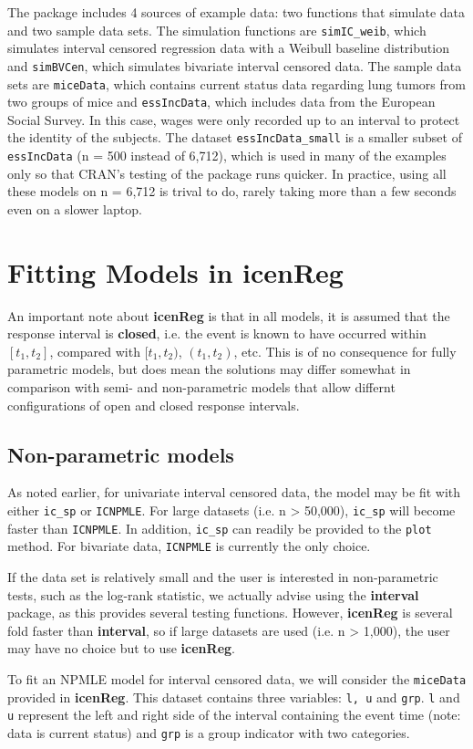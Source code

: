 \documentclass[11pt]{report}
\begin{document}
  The package includes 4 sources of example data: two functions that simulate data and
  two sample data sets. The simulation functions are \texttt{simIC\_weib}, which simulates
  interval censored regression data with a Weibull baseline distribution and 
  \texttt{simBVCen}, which simulates bivariate interval censored data. The sample data sets
  are \texttt{miceData}, which contains current status data regarding lung tumors 
  from two groups of mice and \texttt{essIncData}, which includes data from the European
  Social Survey. In this case, wages were only recorded up to an interval to 
  protect the identity of the subjects. The dataset \texttt{essIncData\_small} is a smaller
  subset of \texttt{essIncData} (n = 500 instead of 6,712), which is used in many of 
  the examples only so that CRAN's testing of the package runs quicker. In practice,
  using all these models on n = 6,712 is trival to do, rarely taking more than a few seconds
  even on a slower laptop. 
  
  
  \chapter{Fitting Models in {\bf{icenReg}} }
  
  An important note about {\bf icenReg} is that in all models, it is assumed that the 
  response interval is {\bf closed}, i.e. the event is known to have occurred within 
  $[t_1, t_2]$, compared with $[t_1, t_2)$, $(t_1, t_2)$, etc. This is of no consequence 
  for fully parametric models, but does mean the solutions may differ somewhat in 
  comparison with semi- and non-parametric models that allow differnt configurations
  of open and closed response intervals. 
  
  \section{Non-parametric models}
  
  As noted earlier, for univariate interval censored data, the model may be fit with either
  \texttt{ic\_sp} or \texttt{ICNPMLE}. For large datasets (i.e. n > 50,000), \texttt{ic\_sp} 
  will become faster than \texttt{ICNPMLE}. In addition, \texttt{ic\_sp} can readily be 
  provided to the \texttt{plot} method. For bivariate data, \texttt{ICNPMLE} is currently
  the only choice. 
  
  If the data set is relatively small and the user is interested in non-parametric tests,
  such as the log-rank statistic, we actually advise using the {\bf interval} package,
  as this provides several testing functions. However, {\bf icenReg} is several fold 
  faster than {\bf interval}, so if large datasets are used (i.e. n > 1,000), the user
  may have no choice but to use {\bf icenReg}.
  
  To fit an NPMLE model for interval censored data, we will consider the \texttt{miceData}
  provided in {\bf icenReg}. This dataset contains three variables: \texttt{l, u} and
  \texttt{grp}. \texttt{l} and \texttt{u} represent the left and right side of the interval
  containing the event time (note: data is current status) and \texttt{grp} is a group
  indicator with two categories. 
  
\end{document}
